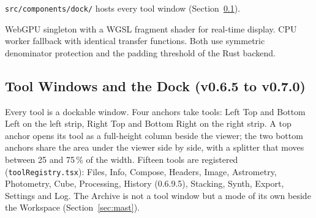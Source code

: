\documentclass[11pt,a4paper]{article}
\newcommand{\code}[1]{\texttt{\small #1}}
\begin{document}
\begin{description}[style=nextline, leftmargin=2cm]
    \item[Dock] \code{src/components/dock/} hosts every tool window (Section~\ref{sec:dock}).
    \item[GPU Rendering] WebGPU singleton with a WGSL fragment shader for real-time display. CPU worker fallback with identical transfer functions. Both use symmetric denominator protection and the padding threshold of the Rust backend.
    \end{description}

    \subsection{Tool Windows and the Dock (v0.6.5 to v0.7.0)}
    \label{sec:dock}

    Every tool is a dockable window. Four anchors take tools: Left Top and Bottom Left on the left strip, Right Top and Bottom Right on the right strip. A top anchor opens its tool as a full-height column beside the viewer; the two bottom anchors share the area under the viewer side by side, with a splitter that moves between 25 and 75\,\% of the width. Fifteen tools are registered (\code{toolRegistry.tsx}): Files, Info, Compose, Headers, Image, Astrometry, Photometry, Cube, Processing, History (0.6.9.5), Stacking, Synth, Export, Settings and Log. The Archive is not a tool window but a mode of its own beside the Workspace (Section~\ref{sec:mast}).
\end{document}
